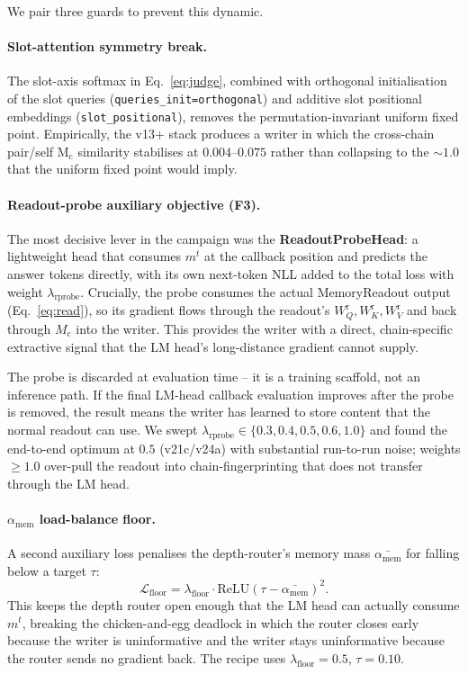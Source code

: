 \documentclass[11pt]{article}
\newcommand{\Mc}{M_{\mathrm{c}}}
\newcommand{\mt}{m^t}
\newcommand{\amem}{\alpha_{\mathrm{mem}}}
\begin{document}
We pair three guards to prevent this dynamic.

\paragraph{Slot-attention symmetry break.}
The slot-axis softmax in Eq.~\ref{eq:judge}, combined with
orthogonal initialisation of the slot queries (\texttt{queries\_init=orthogonal})
and additive slot positional embeddings (\texttt{slot\_positional}),
removes the permutation-invariant uniform fixed point. Empirically,
the v13+ stack produces a writer in which the cross-chain pair/self
M$_\mathrm{c}$ similarity stabilises at $0.004$--$0.075$ rather than
collapsing to the $\sim 1.0$ that the uniform fixed point would
imply.

\paragraph{Readout-probe auxiliary objective (F3).}
The most decisive lever in the campaign was the
\textbf{ReadoutProbeHead}: a lightweight head that consumes $\mt$ at
the callback position and predicts the answer tokens directly, with
its own next-token NLL added to the total loss with weight
$\lambda_{\mathrm{rprobe}}$. Crucially, the probe consumes the actual
MemoryReadout output (Eq.~\ref{eq:read}), so its gradient flows
through the readout's $W_Q^{\mathrm{r}}, W_K^{\mathrm{r}},
W_V^{\mathrm{r}}$ and back through $\Mc$ into the writer. This
provides the writer with a direct, chain-specific extractive signal
that the LM head's long-distance gradient cannot supply.

The probe is discarded at evaluation time -- it is a training
scaffold, not an inference path. If the final LM-head callback
evaluation improves after the probe is removed, the result means the
writer has learned to store content that the normal readout can use.
We swept $\lambda_{\mathrm{rprobe}} \in \{0.3, 0.4, 0.5, 0.6, 1.0\}$
and found the end-to-end optimum at $0.5$ (v21c/v24a) with
substantial run-to-run noise; weights $\geq 1.0$ over-pull the
readout into chain-fingerprinting that does not transfer through
the LM head.

\paragraph{\texorpdfstring{$\amem$}{Alpha-mem} load-balance floor.}
A second auxiliary loss penalises the depth-router's memory mass
$\bar{\amem}$ for falling below a target $\tau$:
\begin{equation}
\mathcal{L}_{\mathrm{floor}} = \lambda_{\mathrm{floor}} \cdot \mathrm{ReLU}(\tau - \bar{\amem})^2.
\label{eq:floor}
\end{equation}
This keeps the depth router open enough that the LM head can actually
consume $\mt$, breaking the chicken-and-egg deadlock in which the
router closes early because the writer is uninformative and the
writer stays uninformative because the router sends no gradient back.
The recipe uses $\lambda_{\mathrm{floor}} = 0.5$, $\tau = 0.10$.
\end{document}
